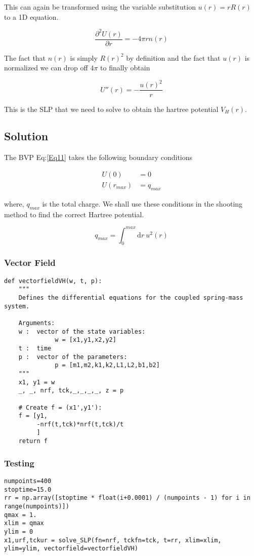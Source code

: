 \documentclass[11pt,a4paper]{article}
\begin{document}
This can again be transformed using the variable substitution
\(u(r)=rR(r)\) to a 1D equation.

\[
\frac{\partial^2 U(r)}{\partial r} = -4\pi r n(r)
\]

The fact that \(n(r)\) is simply \(R(r)^2\) by definition and the
fact that \(u(r)\) is normalized we can drop off \(4\pi\) to finally
obtain

\[
U''(r) = -\frac{u(r)^2}{r}
\]

This is the SLP that we need to solve to obtain the
hartree potential \(V_H(r)\).

\subsection{Solution}
\label{sec:org42835db}

The BVP Eq:\ref{Eq11} takes the following boundary conditions

\begin{align*}
U(0) &= 0\\
U(r_{max}) &= q_{max}
\end{align*}

where, \(q_{max}\) is the total charge. We shall use these conditions
in the shooting method to find the correct Hartree potential.

\[
q_{max} = \int_0^{max} \text{d}r\ u^2(r)
\]

\subsubsection{Vector Field}
\label{sec:org06633f5}
\begin{verbatim}
def vectorfieldVH(w, t, p):
    """
    Defines the differential equations for the coupled spring-mass system.

    Arguments:
    w :  vector of the state variables:
              w = [x1,y1,x2,y2]
    t :  time
    p :  vector of the parameters:
              p = [m1,m2,k1,k2,L1,L2,b1,b2]
    """
    x1, y1 = w
    _, _, nrf, tck,_,_,_,_, z = p

    # Create f = (x1',y1'):
    f = [y1,
         -nrf(t,tck)*nrf(t,tck)/t
         ]
    return f
\end{verbatim}
\subsubsection{Testing}
\label{sec:org0470a91}
\begin{verbatim}
numpoints=400
stoptime=15.0
rr = np.array([stoptime * float(i+0.0001) / (numpoints - 1) for i in range(numpoints)])
qmax = 1.
xlim = qmax
ylim = 0
x1,urf,tckur = solve_SLP(fn=nrf, tckfn=tck, t=rr, xlim=xlim, ylim=ylim, vectorfield=vectorfieldVH)
\end{verbatim}
\end{document}
